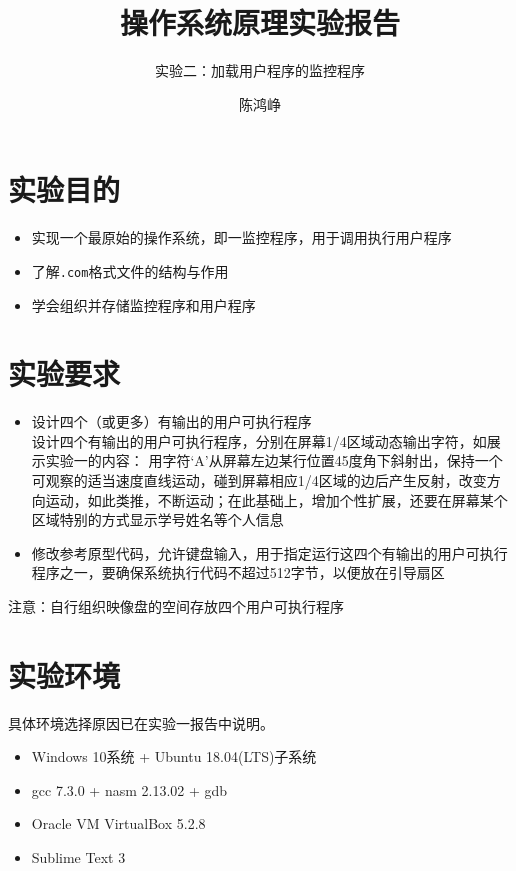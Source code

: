 \documentclass[logo,reportComp]{thesis}
\title{操作系统原理实验报告}
\subtitle{实验二：加载用户程序的监控程序}
\author{陈鸿峥}
\begin{document}
\maketitle

\section{实验目的}
\begin{itemize}
	\item 实现一个最原始的操作系统，即一监控程序，用于调用执行用户程序
    \item 了解\verb'.com'格式文件的结构与作用
	\item 学会组织并存储监控程序和用户程序
\end{itemize}

\section{实验要求}
\begin{itemize}
	\item 设计四个（或更多）有输出的用户可执行程序\\
	设计四个有输出的用户可执行程序，分别在屏幕1/4区域动态输出字符，如展示实验一的内容：
	用字符‘A’从屏幕左边某行位置45度角下斜射出，保持一个可观察的适当速度直线运动，碰到屏幕相应1/4区域的边后产生反射，改变方向运动，如此类推，不断运动；在此基础上，增加个性扩展，还要在屏幕某个区域特别的方式显示学号姓名等个人信息
	\item 修改参考原型代码，允许键盘输入，用于指定运行这四个有输出的用户可执行程序之一，要确保系统执行代码不超过512字节，以便放在引导扇区
\end{itemize}
注意：自行组织映像盘的空间存放四个用户可执行程序

\section{实验环境}
具体环境选择原因已在实验一报告中说明。
\begin{itemize}
	\item Windows 10系统 + Ubuntu 18.04(LTS)子系统
	\item gcc 7.3.0 + nasm 2.13.02 + gdb
	\item Oracle VM VirtualBox 5.2.8
	\item Sublime Text 3
\end{itemize}
\end{document}
